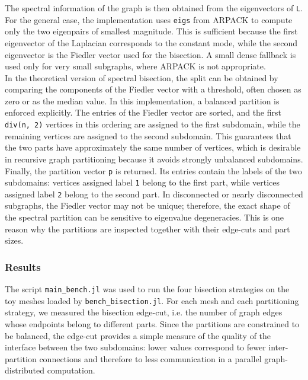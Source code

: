 \documentclass[unicode,10pt,a4paper,oneside,numbers=endperiod,openany]{scrartcl}
\begin{document}
The spectral information of the graph is then obtained from the eigenvectors of \texttt{L}. For the
general case, the implementation uses \texttt{eigs} from ARPACK to compute only the two eigenpairs
of smallest magnitude. This is sufficient because the first eigenvector of the Laplacian corresponds to
the constant mode, while the second eigenvector is the Fiedler vector used for the bisection. A small
dense fallback is used only for very small subgraphs, where ARPACK is not appropriate.\\

In the theoretical version of spectral bisection, the split can be obtained by comparing the components
of the Fiedler vector with a threshold, often chosen as zero or as the median value. In this implementation,
a balanced partition is enforced explicitly. The entries of the Fiedler vector are sorted, and the first
\texttt{div(n, 2)} vertices in this ordering are assigned to the first subdomain, while the remaining
vertices are assigned to the second subdomain. This guarantees that the two parts have approximately
the same number of vertices, which is desirable in recursive graph partitioning because it avoids strongly
unbalanced subdomains.\\

Finally, the partition vector \texttt{p} is returned. Its entries contain the labels of the two subdomains:
vertices assigned label \texttt{1} belong to the first part, while vertices assigned label \texttt{2} belong to
the second part. In disconnected or nearly disconnected subgraphs, the Fiedler vector may not be unique;
therefore, the exact shape of the spectral partition can be sensitive to eigenvalue degeneracies. This is
one reason why the partitions are inspected together with their edge-cuts and part sizes.

\subsubsection{Results}
The script \texttt{main\_bench.jl} was used to run the four bisection strategies on the toy
meshes loaded by \texttt{bench\_bisection.jl}. For each mesh and each partitioning strategy, we
measured the bisection edge-cut, i.e. the number of graph edges whose endpoints belong to
different parts. Since the partitions are constrained to be balanced, the edge-cut provides a
simple measure of the quality of the interface between the two subdomains: lower values
correspond to fewer inter-partition connections and therefore to less communication in a
parallel graph-distributed computation.
\end{document}

